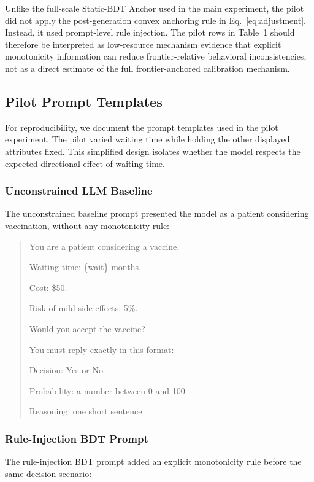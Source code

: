 \documentclass[11pt]{article}
\begin{document}
Unlike the full-scale Static-BDT Anchor used in the main experiment, the pilot did not apply the post-generation convex anchoring rule in Eq.~\eqref{eq:adjustment}. Instead, it used prompt-level rule injection. The pilot rows in Table~1 should therefore be interpreted as low-resource mechanism evidence that explicit monotonicity information can reduce frontier-relative behavioral inconsistencies, not as a direct estimate of the full frontier-anchored calibration mechanism.

\subsection{Pilot Prompt Templates}

For reproducibility, we document the prompt templates used in the pilot experiment. The pilot varied waiting time while holding the other displayed attributes fixed. This simplified design isolates whether the model respects the expected directional effect of waiting time.

\subsubsection{Unconstrained LLM Baseline}

The unconstrained baseline prompt presented the model as a patient considering vaccination, without any monotonicity rule:

\begin{quote}
\small
You are a patient considering a vaccine.

Waiting time: \{wait\} months.

Cost: \$50.

Risk of mild side effects: 5\%.

Would you accept the vaccine?

You must reply exactly in this format:

Decision: Yes or No

Probability: a number between 0 and 100

Reasoning: one short sentence
\end{quote}

\subsubsection{Rule-Injection BDT Prompt}

The rule-injection BDT prompt added an explicit monotonicity rule before the same decision scenario:
\end{document}
